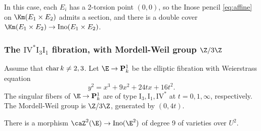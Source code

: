 \documentclass{article}
\DeclareMathOperator{\car}{{\rm char}}
\def\P{\mathbf{P}}
\newcommand{\Ino}{\operatorname{{Ino}}}
\newcommand{\I}{\mathrm{I}}
\newcommand{\IV}{\mathrm{IV}}
\begin{document}
In this case, each $E_i$ has a 2-torsion point $(0,0)$, so the Inose pencil \eqref{eq:affine} on $\Km(E_1\times E_2)$ admits a section, and there is a double cover $\Km(E_1\times E_2)\to \Ino(E_1\times E_2)$. 

\subsubsection{The $\IV^*\I_3\I_1$ fibration, with Mordell-Weil group $\Z/3\Z$}\label{subsec:IV*}
Assume that $\car k\neq 2,3$.   Let $\E\to \P^1_k$ be the elliptic fibration with Weierstrass equation
\begin{equation}
\label{EqEIV}
 y^2 = x^3 + 9 x^2 + 24 t x + 16 t^2. 
 \end{equation}
The singular fibers of $\E\to\P^1_k$ are of type $\I_3,\I_1,\IV^{\ast}$ at $t=0,1,\infty$, respectively.  The Mordell-Weil group is $\Z/3\Z$, generated by $(0,4t)$.  

\begin{prop} There is a morphism $\caZ^2(\E)\to \Ino(\E^2)$ of degree 9 of varieties over $U^2$.
\end{prop}
\end{document}
